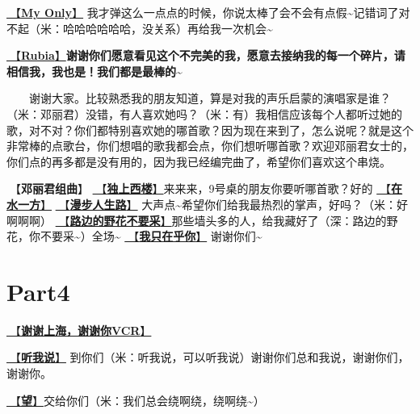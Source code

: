\documentclass[]{ctexbook}
\begin{document}
\hyperref[my-only]{🎵【\textbf{My Only}】} 我才弹这么一点点的时候，你说太棒了会不会有点假\textasciitilde 记错词了对不起（米：哈哈哈哈哈哈，没关系）再给我一次机会\textasciitilde{}

\hyperref[rubia]{🎵【\textbf{Rubia}】}\textbf{谢谢你们愿意看见这个不完美的我，愿意去接纳我的每一个碎片，请相信我，我也是！我们都是最棒的\textasciitilde{}}

  谢谢大家。比较熟悉我的朋友知道，算是对我的声乐启蒙的演唱家是谁？（米：邓丽君）没错，有人喜欢她吗？（米：有）我相信应该每个人都听过她的歌，对不对？你们都特别喜欢她的哪首歌？因为现在来到了，怎么说呢？就是这个非常棒的点歌台，你们想唱的歌我都会点，你们想听哪首歌？欢迎邓丽君女士的，你们点的再多都是没有用的，因为我已经编完曲了，希望你们喜欢这个串烧。

🎵【\textbf{邓丽君组曲}】
\hyperref[one-in-the-building]{🎵【\textbf{独上西楼}】}来来来，9号桌的朋友你要听哪首歌？好的
\hyperref[on-the-water-side]{🎵【\textbf{在水一方}】}
\hyperref[walk-the-road-of-life]{🎵【\textbf{漫步人生路}】} 大声点\textasciitilde 希望你们给我最热烈的掌声，好吗？（米：好啊啊啊）
\hyperref[only-with-me]{🎵【\textbf{路边的野花不要采}】}那些墙头多的人，给我藏好了（深：路边的野花，你不要采\textasciitilde）全场\textasciitilde{}
\hyperref[only-you]{🎵【\textbf{我只在乎你}】} 谢谢你们\textasciitilde{}

\section{Part4}\label{shanghai-20240519-part4}

\hyperref[thank-you-vcr]{🎥【\textbf{谢谢上海，谢谢你VCR}】}

\hyperref[listen-to-me]{🎵【\textbf{听我说}】} 到你们（米：听我说，可以听我说）谢谢你们总和我说，谢谢你们，谢谢你。

\hyperref[Gaze]{🎵【\textbf{望}】}交给你们（米：我们总会绕啊绕，绕啊绕\textasciitilde）
\end{document}
